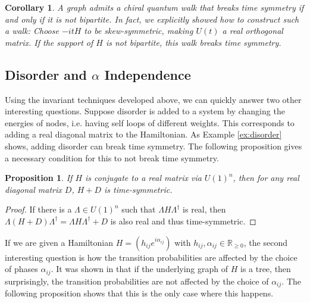 \documentclass[twocolumn,superscriptaddress]{revtex4-1}
\theoremstyle{plain}
\newtheorem{corollary}[theorem]{Corollary}
\newtheorem{proposition}[theorem]{Proposition}
\theoremstyle{definition}
\theoremstyle{definition}
\theoremstyle{definition}
\theoremstyle{definition}
\theoremstyle{definition}
\theoremstyle{definition}
\begin{document}
\begin{corollary}
 A graph admits a chiral quantum walk that breaks time symmetry if and only if it is not bipartite. In fact, we explicitly showed how to construct such a walk: Choose $-itH$ to be skew-symmetric, making $U(t)$ a real orthogonal matrix. If the support of $H$ is not bipartite, this walk breaks time symmetry.
\end{corollary}


\subsection{Disorder and $\alpha$ Independence}

Using the invariant techniques developed above, we can quickly answer two other interesting questions. Suppose disorder is added to a system by changing the energies of nodes, i.e. having self loops of different weights. This corresponds to adding a real diagonal matrix to the Hamiltonian. As Example \ref{ex:disorder} shows, adding disorder can break time symmetry. The following proposition gives a necessary condition for this to not break time symmetry.
\begin{proposition}\label{prop:adddiag}
If $H$ is conjugate to a real matrix via $U(1)^n$, then for any real diagonal matrix $D$, $H+D$ is time-symmetric.
\end{proposition}
\begin{proof}
If there is a $\Lambda\in U(1)^n$ such that $\Lambda H\Lambda^\dagger$ is real, then $\Lambda(H+D)\Lambda^\dagger=\Lambda H\Lambda^\dagger+D$ is also real and thus time-symmetric.
\end{proof}



If we are given a Hamiltonian $H=(h_{ij}e^{i\alpha_{ij}})$ with $h_{ij},\alpha_{ij}\in\mathbb{R}_{\ge0}$, the second interesting question is how the transition probabilities are affected by the choice of phases $\alpha_{ij}$. It was shown in \cite{Z13} that if the underlying graph of $H$ is a tree, then surprisingly, the transition probabilities are not affected by the choice of $\alpha_{ij}$. The following proposition shows that this is the only case where this happens.
\end{document}
